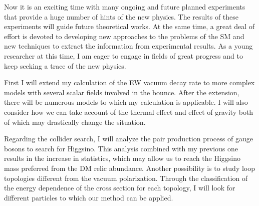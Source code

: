 \documentclass[12pt,notitlepage]{article}
\begin{document}

Now it is an exciting time with many ongoing and future planned experiments that provide a huge number of hints of the new physics.
The results of these experiments will guide future theoretical works.
At the same time, a great deal of effort is devoted to developing new approaches to the problems of the SM and new techniques to extract the information from experimental results.
As a young researcher at this time, I am eager to engage in fields of great progress and to keep seeking a trace of the new physics.

First I will extend my calculation of the EW vacuum decay rate to more complex models with several scalar fields involved in the bounce.
After the extension, there will be numerous models to which my calculation is applicable.
I will also consider how we can take account of the thermal effect and effect of gravity both of which may drastically change the situation.

Regarding the collider search, I will analyze the pair production process of gauge bosons to search for Higgsino.
This analysis combined with my previous one results in the increase in statistics, which may allow us to reach the Higgsino mass preferred from the DM relic abundance.
Another possibility is to study loop topologies different from the vacuum polarization.
Through the classification of the energy dependence of the cross section for each topology, I will look for different particles to which our method can be applied.
\end{document}
